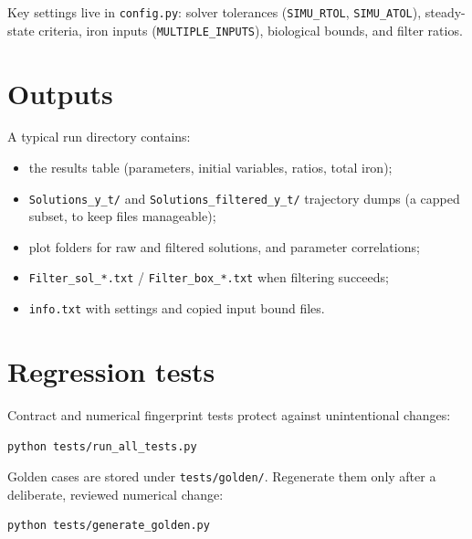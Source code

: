 Key settings live in \texttt{config.py}: solver tolerances
(\texttt{SIMU\_RTOL}, \texttt{SIMU\_ATOL}), steady-state criteria, iron inputs
(\texttt{MULTIPLE\_INPUTS}), biological bounds, and filter ratios.

\section{Outputs}
A typical run directory contains:
\begin{itemize}
  \item the results table (parameters, initial variables, ratios, total iron);
  \item \texttt{Solutions\_y\_t/} and \texttt{Solutions\_filtered\_y\_t/}
  trajectory dumps (a capped subset, to keep files manageable);
  \item plot folders for raw and filtered solutions, and parameter correlations;
  \item \texttt{Filter\_sol\_*.txt} / \texttt{Filter\_box\_*.txt} when filtering
  succeeds;
  \item \texttt{info.txt} with settings and copied input bound files.
\end{itemize}

\section{Regression tests}
Contract and numerical fingerprint tests protect against unintentional changes:

\begin{lstlisting}
python tests/run_all_tests.py
\end{lstlisting}

Golden cases are stored under \texttt{tests/golden/}. Regenerate them only after
a deliberate, reviewed numerical change:

\begin{lstlisting}
python tests/generate_golden.py
\end{lstlisting}
